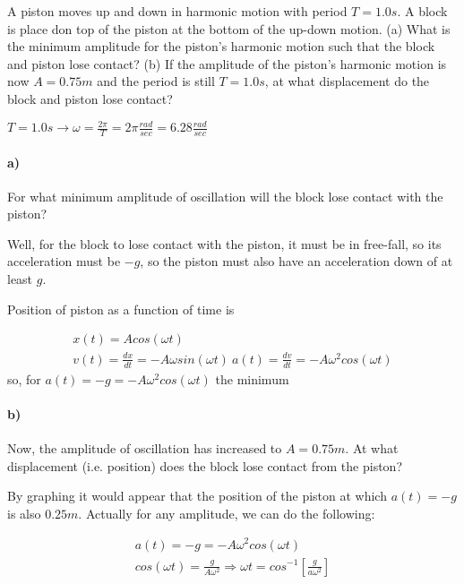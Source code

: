 \documentclass[10pt]{article}
\newcommand{\boxeq}[1]{%
  \begin{center}%
    \boxed{#1}%
  \end{center}%
}
\begin{document}
A piston moves up and down in harmonic motion with period $T=1.0s$. A block is
place don top of the piston at the bottom of the up-down motion. (a) What is
the minimum amplitude for the piston's harmonic motion such that the block and
piston lose contact? (b) If the amplitude of the piston's harmonic motion is
now $A=0.75m$ and the period is still $T=1.0s$, at what displacement do the
block and piston lose contact?

$T=1.0s \rightarrow
\omega=\frac{2\pi}{T}=2\pi\frac{rad}{sec}=6.28\frac{rad}{sec}$

\paragraph{a)}
\label{par:a_}

For what minimum amplitude of oscillation will the block lose contact with the
piston?

Well, for the block to lose contact with the piston, it must be in free-fall, so
its acceleration must be $-g$, so the piston must also have an acceleration
down of at least $g$.

Position of piston as a function of time is

\begin{align*}
  x(t) = Acos(\omega t)\\
  v(t) = \frac{dx}{dt} = -A\omega sin(\omega t)\
  a(t) = \frac{dv}{dt} = -A\omega^2cos(\omega t)
\end{align*}
so, for $a(t) = -g = -A\omega^2cos(\omega t)$ the minimum

\boxeq{A_{min}=\frac{g}{\omega^2}=\frac{9.8\frac{m}{s^2}}{\left(6.28\frac{rad}{sec}\right)^2}=0.25m}

\paragraph{b)}
\label{par:b_}

Now, the amplitude of oscillation has increased to $A=0.75m$. At what
displacement (i.e. position) does the block lose contact from the piston?

By graphing it would appear that the position of the piston at which $a(t)=-g$
is also $0.25m$. Actually for any amplitude, we can do the following:

\begin{align*}
  a(t) = -g = -A\omega^2cos(\omega t)\\
  cos(\omega t) = \frac{g}{A\omega^2} \Rightarrow \omega
  t=cos^{-1}\left[\frac{g}{a\omega^2}\right]
\end{align*}
\end{document}
